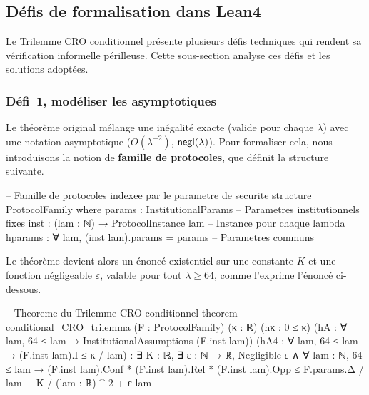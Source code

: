 \subsection{D\'efis de formalisation dans Lean4}
\label{subsec:defis_formalisation}
\begin{sloppypar}
Le Trilemme CRO conditionnel pr\'esente plusieurs d\'efis techniques qui
rendent sa v\'erification informelle p\'erilleuse.
Cette sous-section analyse ces d\'efis et les solutions adopt\'ees.

\subsubsection{D\'efi~1, mod\'eliser les asymptotiques}
\label{subsubsec:defi_asymptotiques}

Le th\'eor\`eme original m\'elange une in\'egalit\'e exacte (valide pour
chaque $\lambda$) avec une notation asymptotique ($O(\lambda^{-2})$,
$\mathsf{negl}(\lambda)$). Pour formaliser cela, nous
introduisons la notion de \textbf{famille de protocoles}, que d\'efinit la
structure suivante.

\begin{leancode}[caption={Structure ProtocolFamily des familles de protocoles en Lean4}, label={lst:lean4_protocol_family}]
-- Famille de protocoles indexee par le parametre de securite
structure ProtocolFamily where
  params  : InstitutionalParams                -- Parametres institutionnels fixes
  inst    : (lam : ℕ) → ProtocolInstance lam   -- Instance pour chaque lambda
  hparams : ∀ lam, (inst lam).params = params  -- Parametres communs
\end{leancode}

Le th\'eor\`eme devient alors un \'enonc\'e existentiel sur une
constante $K$ et une fonction n\'egligeable $\varepsilon$, valable pour tout
$\lambda \geq 64$, comme l'exprime l'\'enonc\'e ci-dessous.

\begin{leancode}[caption={\'Enonc\'e asymptotique du th\'eor\`eme principal en Lean4}, label={lst:main_theorem_statement}]
-- Theoreme du Trilemme CRO conditionnel
theorem conditional_CRO_trilemma (F : ProtocolFamily) (κ : ℝ) (hκ : 0 ≤ κ)
    (hA : ∀ lam, 64 ≤ lam → InstitutionalAssumptions (F.inst lam))
    (hA4 : ∀ lam, 64 ≤ lam → (F.inst lam).I ≤ κ / lam) :
    ∃ K : ℝ, ∃ ε : ℕ → ℝ, Negligible ε ∧ ∀ lam : ℕ, 64 ≤ lam →
      (F.inst lam).Conf * (F.inst lam).Rel * (F.inst lam).Opp ≤
        F.params.Δ / lam + K / (lam : ℝ) ^ 2 + ε lam
\end{leancode}


\end{sloppypar}
